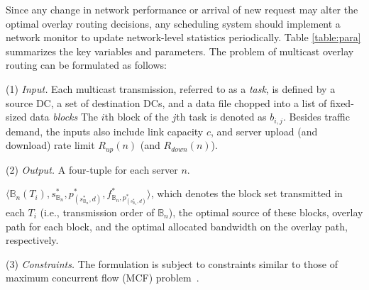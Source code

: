 Since any change in network performance or arrival of
new request may alter the optimal overlay
routing decisions, any scheduling system should implement a network monitor to update network-level statistics periodically.
Table \ref{table:para} summarizes the key variables and parameters. The problem of multicast overlay routing can be formulated as follows:


\noindent(1) {\em Input.} %
Each multicast transmission, referred to as a {\em task}, is defined
by a source DC, a set of destination DCs, and a data file chopped into
a list of fixed-sized data
{\em blocks}
The $i$th block of the $j$th task is denoted as $b_{i,j}$.
Besides traffic demand, the inputs also include link capacity $c$, and
server upload (and download) rate limit $R_{up}(n)$ (and $R_{down}(n)$).

\noindent(2) {\em Output.} A four-tuple for each server $n$.

$\langle \mathbb{B}_n(T_i), s_{\mathbb{B}_n}^*, p^*_{(s^*_{\mathbb{B}_n},d)}, f^*_{\mathbb{B}_n,p^*_{(s^*_{\mathbb{B}_n},d)}} \rangle$, which denotes the block set transmitted in each $T_i$ (i.e., transmission order of $\mathbb{B}_n$), the optimal source of these blocks, overlay path for each block, and the optimal allocated bandwidth on the overlay path, respectively.

\noindent(3) {\em Constraints.}
The formulation is subject to constraints similar to those of maximum concurrent flow (MCF) problem~\cite{garg2007faster}.

